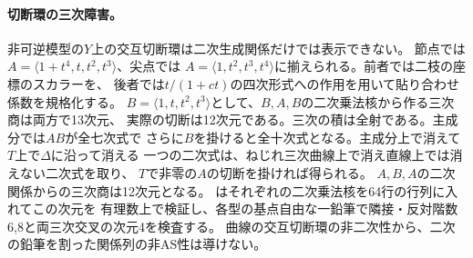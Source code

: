 \paragraph{切断環の三次障害。}
非可逆模型の$Y$上の交互切断環は二次生成関係だけでは表示できない。
節点では$A=\langle1+t^4,t,t^2,t^3\rangle$、尖点では
$A=\langle1,t^2,t^3,t^4\rangle$に揃えられる。前者では二枝の座標のスカラーを、
後者では$t/(1+ct)$の四次形式への作用を用いて貼り合わせ係数を規格化する。
$B=\langle1,t,t^2,t^3\rangle$として、$B,A,B$の二次乗法核から作る三次商は両方で13次元、
実際の切断は12次元である。三次の積は全射である。主成分では$AB$が全七次式で
さらに$B$を掛けると全十次式となる。主成分上で消えて$T$上で$\Delta$に沿って消える
一つの二次式は、ねじれ三次曲線上で消え直線上では消えない二次式を取り、
$T$で非零の$A$の切断を掛ければ得られる。
$A,B,A$の二次関係からの三次商は12次元となる。
はそれぞれの二次乗法核を64行の行列に入れてこの次元を
有理数上で検証し、各型の基点自由な一鉛筆で隣接・反対階数6,8と両三次交叉の次元4を検査する。
曲線の交互切断環の非二次性から、二次の鉛筆を割った関係列の非AS性は導けない。

